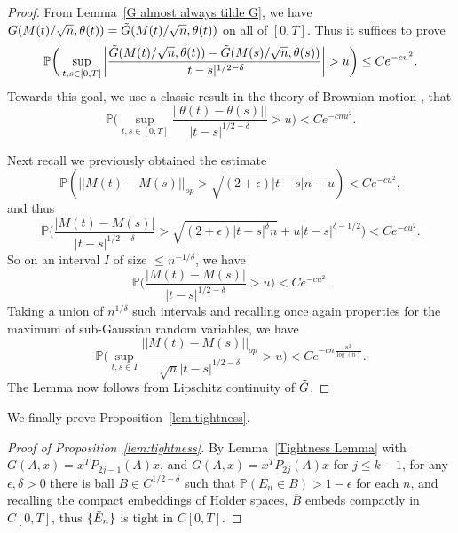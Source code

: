 \documentclass{amsart}
\numberwithin{equation}{section}
\newcommand{\pr}{\mathbb{P}}
\begin{document}
\begin{proof}
    From Lemma~\ref{G almost always tilde G}, we have $G(M(t)/\sqrt{n},\theta(t)) =\Tilde{G}(M(t)/\sqrt{n},\theta(t))$ on all of $[0,T]$. Thus it suffices to prove
    \begin{equation*}
        \pr\bigg(\sup_{t,s \in [0,T]}\bigg|\frac{\Tilde{G}(M(t)/\sqrt{n},\theta(t))-\Tilde{G}(M(s)/\sqrt{n},\theta(s))}{|t-s|^{1/2-\delta}}\bigg|>u\bigg) \leq Ce^{-c u^2}.
    \end{equation*}
    Towards this goal, we use a classic result in the theory of Brownian motion \cite{gall2016brownian}, that 
    \begin{equation*}
        \pr\bigg(\sup_{t,s \in [0,T]}\frac{||\theta(t)-\theta(s)||}{|t-s|^{1/2-\delta}}>u \bigg)< Ce^{-cnu^2}.
    \end{equation*}

    Next recall we previously obtained the estimate
    \begin{equation*}
        \pr(||M(t)-M(s)||_{op}> \sqrt{(2+\epsilon)|t-s|n}+u)< Ce^{-cu^2},
    \end{equation*}
    and thus 
    \begin{equation*}
        \pr\bigg(\frac{|M(t)-M(s)|}{|t-s|^{1/2-\delta}}> \sqrt{(2+\epsilon)|t-s|^{\delta}n}+u|t-s|^{\delta-1/2}\bigg)< Ce^{-cu^2}. 
    \end{equation*}
    So on an interval $I$ of size $\leq n^{-1/\delta}$, we have
    \begin{equation*}
        \pr\bigg(\frac{|M(t)-M(s)|}{|t-s|^{1/2-\delta}}>u \bigg)< Ce^{-cu^2}.
    \end{equation*}
    Taking a union of $n^{1/\delta}$ such intervals and recalling once again properties for the maximum of sub-Gaussian random variables, we have
    \begin{equation*}
        \pr\bigg(\sup_{t,s \in I}\frac{||M(t)-M(s)||_{op}}{\sqrt{n}|t-s|^{1/2-\delta}}>u \bigg)< Ce^{-cn\frac{u^2}{\log(n)}}.
    \end{equation*}
    The Lemma now follows from Lipschitz continuity of $\Tilde{G}$.
\end{proof}
We finally prove Proposition~\ref{lem:tightness}. 

\begin{proof}[Proof of Proposition~\ref{lem:tightness}]
    By Lemma~\ref{Tightness Lemma} with $G(A,x)= x^T P_{2j-1}(A)x$, and $G(A,x)= x^T P_{2j}(A)x$ for $j\leq k-1$, for any $\epsilon, \delta>0$ there is ball $B \in C^{1/2-\delta}$ such that $\pr(E_n \in B)>1-\epsilon$ for each $n$, and recalling the compact embeddings of Holder spaces, $\overline{B}$ embeds compactly in $C[0,T]$, thus $\{\Tilde{E}_n\}$ is tight in  $C[0,T]$.
\end{proof}
\end{document}
